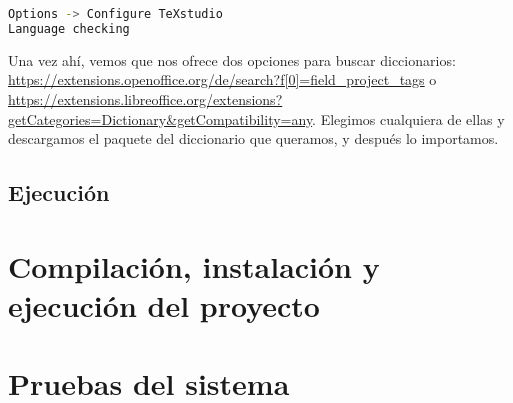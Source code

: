 \begin{lstlisting}[language=bash,caption={Añadir diccionario}]
Options -> Configure TeXstudio
Language checking
\end{lstlisting}

Una vez ahí, vemos que nos ofrece dos opciones para buscar diccionarios: \url{https://extensions.openoffice.org/de/search?f[0]=field_project_tags} o \url{https://extensions.libreoffice.org/extensions?getCategories=Dictionary&getCompatibility=any}. Elegimos cualquiera de ellas y descargamos el paquete del diccionario que queramos, y después lo importamos.


\subsection{Ejecución}

\section{Compilación, instalación y ejecución del proyecto}


\section{Pruebas del sistema}
